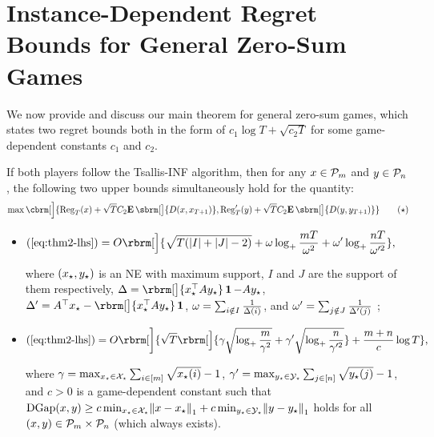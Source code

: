 \section{Instance-Dependent Regret Bounds for General Zero-Sum Games}\label{sec:MSNE}
{
\allowdisplaybreaks

We now provide and discuss our main theorem for general zero-sum games,
which states two regret bounds both in the form of $c_1\log T + \sqrt{c_2T}$ for some game-dependent constants $c_1$ and $c_2$.
\begin{theorem}\label{thm:general-bound-together}
If both players follow the Tsallis-INF algorithm, then for any $x \in \mathcal{P}_m$ and $y\in \mathcal{P}_n$, the following two upper bounds simultaneously hold for the quantity: %
\begin{equation}
\max\cbrm[\Big]{
            \Rr_T(x)
            +
            \sqrt{T}\constd{\E\sbrm[\big]{
                D(x, x_{T+1})
            }},
            \Rc_T(y)
            +
            \sqrt{T}\constd{\E\sbrm[\big]{
                D(y, y_{T+1})
            }}}
    \tag{$\star$}\label{eq:thm2-lhs}
\end{equation}
\begin{itemize}[leftmargin=*]
\item \label{enum:main-bound-omega} \hspace{1in}
$\displaystyle
\rbr{\text{\ref{eq:thm2-lhs}}}=
O\rbrm[\Big]{\sqrt{T(|I|+|J|-2)} + 
\omegar
\log_{+}\frac{mT}{\omegar^2}
+
\omegac
\log_{+}\frac{nT}{\omegac^2}},
$


where $(x_{\star}, y_{\star})$ is an NE with maximum support, $I$ and $J$ are the support of them respectively,
$\Deltar = \rbrm[\big]{\xstar^\top A \ystar}\one - A \ystar$, %
$\Deltac = A^\top \xstar - \rbrm[\big]{\xstar^\top A \ystar}\one$, $\omega=\sum_{i \notin I}\frac{1}{\Delta(i)}$, and $\omega'=\sum_{j \notin J}\frac{1}{\Delta'(j)}$
;

\item \label{enum:main-bound-gamma} \hspace{1in}
$\displaystyle
\rbr{\text{\ref{eq:thm2-lhs}}}=
O\rbrm[\bigg]{\sqrt{T}\rbrm[\Big]{
    \gammar\sqrt{\log_{+}\frac{m}{\gammar^2}}+\gammac\sqrt{\log_{+}\frac{n}{\gammac^2}}
} + 
\frac{m+n}{c}\log T
},
$

where $\gamma = \max_{x_{\star} \in \mathcal{X}_{\star}} \sum_{i\in [m]} \sqrt{x_{\star}(i)} - 1$, $\gamma' = \max_{y_{\star} \in \mathcal{Y}_{\star}} \sum_{j\in [n]} \sqrt{y_{\star}(j)} - 1$,
and $c >0$ is a game-dependent constant such that $\DG(x,y)\geq c \min_{\xstar\in\xstarset}\nbr{x-\xstar}_1 +c \min_{\ystar\in\ystarset}\nbr{y-\ystar}_1$ holds for all $(x,y) \in \mathcal{P}_m \times \mathcal{P}_n$ (which always exists).


\end{itemize}
\end{theorem}}

